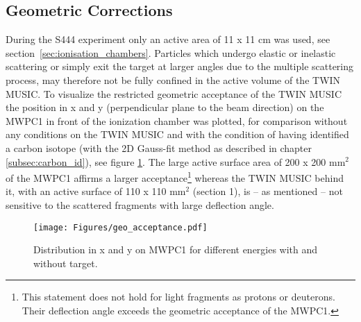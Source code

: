 \subsection{Geometric Corrections}\label{sec:geo_corr}
During the S444 experiment only an active area of 11 x 11 cm was used, see section~\ref{sec:ionisation_chambers}. Particles which undergo elastic or inelastic scattering or simply exit the target at larger angles due to the multiple scattering process, may therefore not be fully confined in the active volume of the TWIN MUSIC. To visualize the restricted geometric acceptance of the TWIN MUSIC the position in x and y (perpendicular plane to the beam direction) on the MWPC1 in front of the ionization chamber was plotted, for comparison without any conditions on the TWIN MUSIC and with the condition of having identified a carbon isotope (with the 2D Gauss-fit method as described in chapter \ref{subsec:carbon_id}), see figure \ref{fig:mw1_xy}. The large active surface area of 200 x 200 mm$^{2}$ of the MWPC1 affirms a larger acceptance\footnote{This statement does not hold for light fragments as protons or deuterons. Their deflection angle exceeds the geometric acceptance of the MWPC1.} whereas the TWIN MUSIC behind it, with an active surface of 110 x 110 mm$^{2}$ (section 1), is -- as mentioned -- not sensitive to the scattered fragments with large deflection angle.\newline
\begin{figure}[htpb]
    \centering
    \texttt{[image: Figures/geo\_acceptance.pdf]}
    \caption{
    Distribution in x and y on MWPC1 for different energies with and without target. 
     }
    \label{fig:mw1_xy}
\end{figure}


